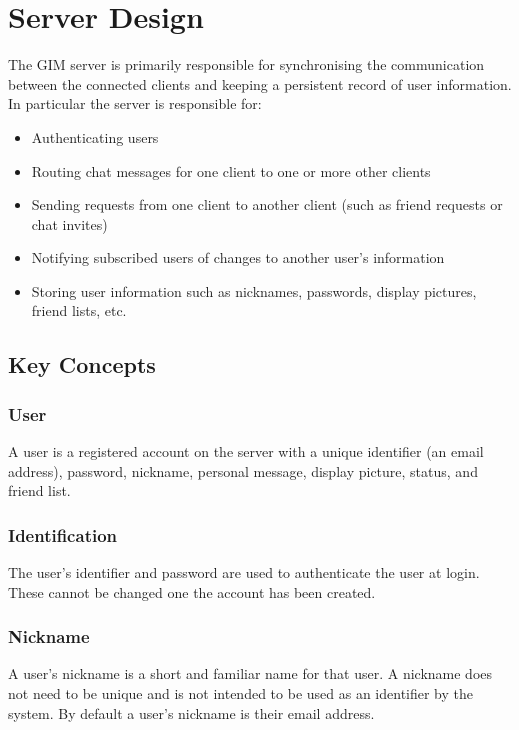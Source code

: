 \section{Server Design}

The GIM server is primarily responsible for synchronising the communication between the connected clients and keeping a persistent record of user information. In particular the server is responsible for:

\begin{itemize}
    \item{Authenticating users}
    \item{Routing chat messages for one client to one or more other clients}
    \item{Sending requests from one client to another client (such as friend requests or chat invites)}
    \item{Notifying subscribed users of changes to another user's information}
    \item{Storing user information such as nicknames, passwords, display pictures, friend lists, etc.}
\end{itemize}

\subsection{Key Concepts}

\subsubsection{User}
A user is a registered account on the server with a unique identifier (an email address), password, nickname, personal message, display picture, status, and friend list. 

\subsubsection{Identification}
The user's identifier and password are used to authenticate the user at login. These cannot be changed one the account has been created. 

\subsubsection{Nickname}
A user's nickname is a short and familiar name for that user. A nickname does not need to be unique and is not intended to be used as an identifier by the system. By default a user's nickname is their email address.

